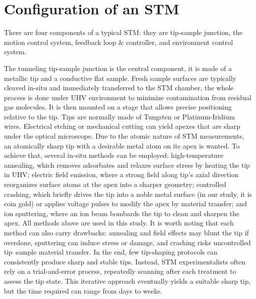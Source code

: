 \section{Configuration of an STM}
There are four components of a typical STM: they are tip-sample junction, the motion control system, feedback loop $\&$ controller, and environment control system. 

The tunneling tip-sample junction is the central component, it is made of a metallic tip and a conductive flat sample. Fresh sample surfaces are typically cleaved in-situ and immediately transferred to the STM chamber, the whole process is done under \ac{UHV} environment to minimize contamination from residual gas molecules. It is then mounted on a stage that allows precise positioning relative to the tip. Tips are normally made of Tungsten or Platinum-Iridium wires. Electrical etching or mechanical cutting can yield apexes that are sharp under the optical microscope. Due to the atomic nature of \ac{STM} measurements, an atomically sharp tip with a desirable metal atom on its apex is wanted. To achieve that, several in-situ methods can be employed: high-temperature annealing, which removes adsorbates and relaxes surface stress by heating the tip in UHV; electric field emission, where a strong field along tip's axial direction reorganizes surface atoms at the apex into a sharper geometry; controlled crashing, which briefly drives the tip into a noble metal surface (in our study, it is coin gold) or applies voltage pulses to modify the apex by material transfer; and ion sputtering, where an ion beam bombards the tip to clean and sharpen the apex. All methods above are used in this study. It is worth noting that each method can also carry drawbacks: annealing and field effects may blunt the tip if overdone, sputtering can induce stress or damage, and crashing risks uncontrolled tip–sample material transfer. In the end, few tip-shaping protocols can consistently produce sharp and stable tips. Instead, STM experimentalists often rely on a trial-and-error process, repeatedly scanning after each treatment to assess the tip state. This iterative approach eventually yields a suitable sharp tip, but the time required can range from days to weeks.



